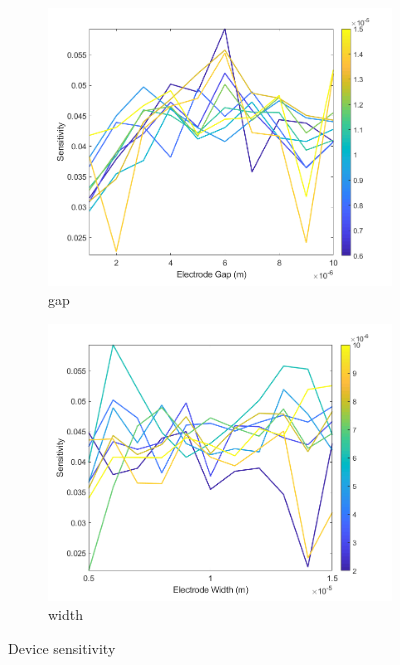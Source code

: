 \begin{figure}[h]
    \\
    \vspace{0.1 in}
    \begin{subfigure}[b]{0.49\textwidth}
        \centering
        \includegraphics[width=\textwidth]{images/comsol_device_gapXsensitivity.png}
        \caption{gap}
    \end{subfigure}
    \hfill
    \begin{subfigure}[b]{0.49\textwidth}
        \centering
        \includegraphics[width=\textwidth]{images/comsol_device_widthXsensitivity.png}
        \caption{width}
    \end{subfigure}
    \caption[Device sensitivity]{Device sensitivity}
    \label{fig:device_sensitivity}
\end{figure}

